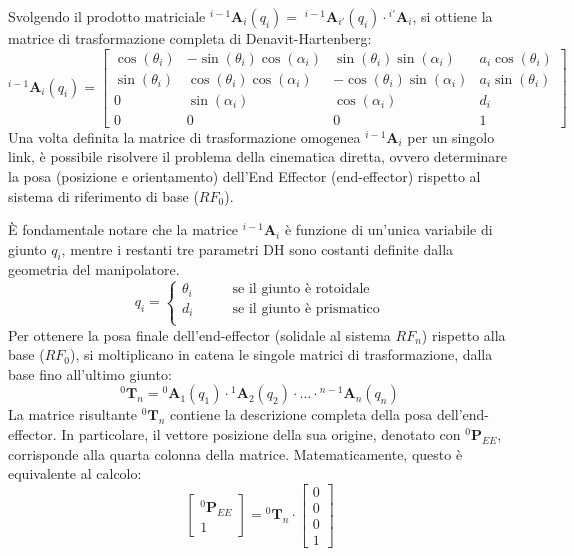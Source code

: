 \documentclass[11pt, a4paper]{report}
\begin{document}
\noindent Svolgendo il prodotto matriciale $^{i - 1}\bm{A}_{i}(q_{i}) = \; ^{i - 1}\bm{A}_{i'}(q_{i}) \cdot {^{i'}\bm{A}_{i}}$, si ottiene la matrice di trasformazione completa di Denavit-Hartenberg:
\[
    ^{i - 1}\bm{A}_{i}(q_{i}) =
    \begin{bmatrix}
        \cos(\theta_i) & -\sin(\theta_i)\cos(\alpha_{i}) & \sin(\theta_i)\sin(\alpha_{i}) & a_{i}\cos(\theta_{i})\\
        \sin(\theta_i) & \cos(\theta_i)\cos(\alpha_{i}) & -\cos(\theta_i)\sin(\alpha_{i}) & a_{i}\sin(\theta_{i})\\
        0 & \sin(\alpha_{i}) & \cos(\alpha_{i}) & d_{i}\\
        0 & 0 & 0 & 1
    \end{bmatrix}
\]
\newpage
Una volta definita la matrice di trasformazione omogenea \(^{i-1}\mathbf{A}_{i}\) per un singolo link, è possibile risolvere il problema della cinematica diretta, ovvero determinare la posa (posizione e orientamento) dell'End Effector (end-effector) rispetto al sistema di riferimento di base (\(RF_0\)).

È fondamentale notare che la matrice \(^{i-1}\mathbf{A}_{i}\) è funzione di un'unica variabile di giunto \(q_i\), mentre i restanti tre parametri DH sono costanti definite dalla geometria del manipolatore.
\[
    q_{i} =
    \begin{cases}
        \theta_{i} \qquad&\text{se il giunto è rotoidale}\\
        d_{i} \qquad&\text{se il giunto è prismatico}\\
    \end{cases}
\]
Per ottenere la posa finale dell'end-effector (solidale al sistema \(RF_n\)) rispetto alla base (\(RF_0\)), si moltiplicano in catena le singole matrici di trasformazione, dalla base fino all'ultimo giunto:
\[
    ^{0}\bm{T}_{n} = {^{0}\bm{A}_{1}(q_{1})} \cdot {^{1}\bm{A}_{2}(q_{2})} \cdot \dots \cdot {^{n-1}\bm{A}_{n}(q_{n})}
\]
La matrice risultante $^{0}\bm{T}_{n}$ contiene la descrizione completa della posa dell'end-effector. In particolare, il vettore posizione della sua origine, denotato con $^{0}\bm{P}_{EE}$, corrisponde alla quarta colonna della matrice. Matematicamente, questo è equivalente al calcolo:
\[
    \begin{bmatrix}
        ^{0}\bm{P}_{EE} \\
        1
    \end{bmatrix}
    = {^{0}\bm{T}_{n}} \cdot
    \begin{bmatrix}
        0 \\ 0 \\ 0 \\ 1
    \end{bmatrix}
\]
\end{document}
